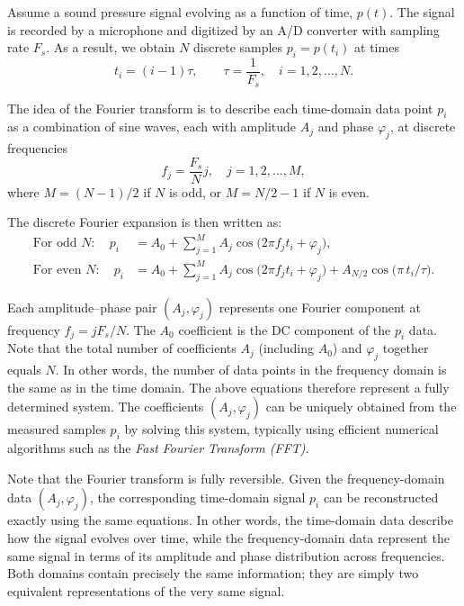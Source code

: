 \documentclass[12pt,a4paper]{article}
\begin{document}
Assume a sound pressure signal evolving as a function of time, $p(t)$. The signal is recorded by a microphone and digitized by an A/D converter with sampling rate \(F_s\). As a result, we obtain $N$ discrete samples $p_i = p(t_i)$ at times
\[
t_i = (i-1)\tau, \qquad \tau = \frac{1}{F_s}, \quad i = 1, 2, \ldots, N.
\]

The idea of the Fourier transform is to describe each time-domain data point \(p_i\)
as a combination of sine waves, each with amplitude \(A_j\) and phase \(\varphi_j\),
at discrete frequencies
\[
f_j = \frac{F_s}{N}j, \quad j = 1, 2, \ldots, M,
\]
where \(M = (N - 1)/2\) if \(N\) is odd, or \(M = N/2 - 1\) if \(N\) is even.

The discrete Fourier expansion is then written as:
\begin{align}
\text{For odd } N:\quad
p_i &= A_0 + \sum_{j=1}^{M} A_j \cos\!\big(2\pi f_j t_i + \varphi_j\big), \\[6pt]
\text{For even } N:\quad
p_i &= A_0 + \sum_{j=1}^{M} A_j \cos\!\big(2\pi f_j t_i + \varphi_j\big)
      + A_{N/2}\cos\!\big(\pi\, t_i / \tau\big).
\end{align}

Each amplitude–phase pair \((A_j, \varphi_j)\) represents one Fourier component at frequency \(f_j = jF_s/N\). The $A_0$ coefficient is the DC component of the $p_i$ data. Note that the total number of coefficients $A_j$ (including $A_0$) and $\varphi_j$ together equals \(N\). In other words, the number of data points in the frequency domain is the same as in the time domain. The above equations therefore represent a fully determined system. The coefficients \((A_j, \varphi_j)\) can be uniquely obtained from the measured samples \(p_i\) by solving this system, typically using efficient numerical algorithms such as the
\emph{Fast Fourier Transform (FFT)}.

Note that the Fourier transform is fully reversible. Given the frequency-domain data \((A_j, \varphi_j)\), the corresponding time-domain signal \(p_i\) can be reconstructed exactly using the same equations.  
In other words, the time-domain data describe how the signal evolves over time, while the frequency-domain data represent the same signal in terms of its amplitude and phase distribution across frequencies. Both domains contain precisely the same information; they are simply two equivalent representations of the very same signal.
\end{document}
